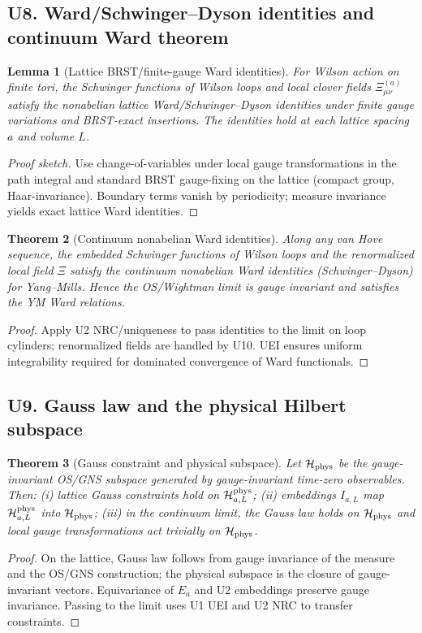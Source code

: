\documentclass[11pt]{amsart}
\theoremstyle{plain}
\newtheorem{theorem}{Theorem}[section]
\newtheorem{lemma}[theorem]{Lemma}
\theoremstyle{definition}
\theoremstyle{remark}
\begin{document}
\subsection{U8. Ward/Schwinger–Dyson identities and continuum Ward theorem}
\begin{lemma}[Lattice BRST/finite-gauge Ward identities]
For Wilson action on finite tori, the Schwinger functions of Wilson loops and local clover fields $\Xi^{(a)}_{\mu\nu}$ satisfy the nonabelian lattice Ward/Schwinger–Dyson identities under finite gauge variations and BRST-exact insertions. The identities hold at each lattice spacing $a$ and volume $L$.
\end{lemma}
\begin{proof}[Proof sketch]
Use change-of-variables under local gauge transformations in the path integral and standard BRST gauge-fixing on the lattice (compact group, Haar-invariance). Boundary terms vanish by periodicity; measure invariance yields exact lattice Ward identities.
\end{proof}
\begin{theorem}[Continuum nonabelian Ward identities]\label{thm:U8-ward-cont}
Along any van Hove sequence, the embedded Schwinger functions of Wilson loops and the renormalized local field $\Xi$ satisfy the continuum nonabelian Ward identities (Schwinger–Dyson) for Yang–Mills. Hence the OS/Wightman limit is gauge invariant and satisfies the YM Ward relations.
\end{theorem}
\begin{proof}
Apply U2 NRC/uniqueness to pass identities to the limit on loop cylinders; renormalized fields are handled by U10. UEI ensures uniform integrability required for dominated convergence of Ward functionals.
\end{proof}

\subsection{U9. Gauss law and the physical Hilbert subspace}
\begin{theorem}[Gauss constraint and physical subspace]\label{thm:U9-gauss}
Let $\mathcal H_{\rm phys}$ be the gauge-invariant OS/GNS subspace generated by gauge-invariant time-zero observables. Then: (i) lattice Gauss constraints hold on $\mathcal H_{a,L}^{\rm phys}$; (ii) embeddings $I_{a,L}$ map $\mathcal H_{a,L}^{\rm phys}$ into $\mathcal H_{\rm phys}$; (iii) in the continuum limit, the Gauss law holds on $\mathcal H_{\rm phys}$ and local gauge transformations act trivially on $\mathcal H_{\rm phys}$.
\end{theorem}
\begin{proof}
On the lattice, Gauss law follows from gauge invariance of the measure and the OS/GNS construction; the physical subspace is the closure of gauge-invariant vectors. Equivariance of $E_a$ and U2 embeddings preserve gauge invariance. Passing to the limit uses U1 UEI and U2 NRC to transfer constraints.
\end{proof}
\end{document}

